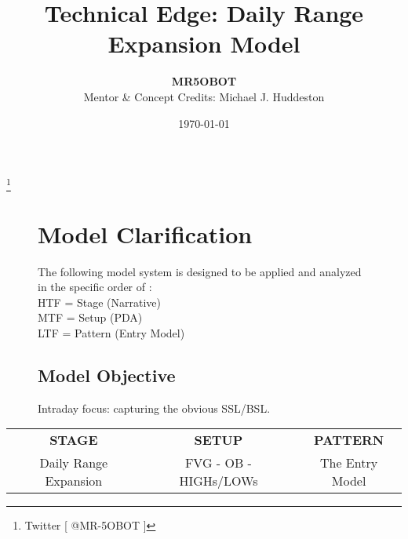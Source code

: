 \documentclass{article}
\title{Technical Edge: Daily Range Expansion Model}
\author{\textbf{MR5OBOT} \\ \small{Mentor \& Concept Credits: Michael J. Huddeston}}
\date{\today}
\renewcommand{\maketitle}{%
  \begin{center}
    \vspace*{\fill}
    {\huge\bfseries\thetitle\par}
    \vspace{1.5cm}
    {\Large\theauthor\par}
    \vspace{1cm}
    \vspace*{\fill}
  \end{center}
}
\begin{document}
\maketitle


\renewcommand{\thefootnote}{}
\footnote{Twitter [ @MR-5OBOT ]}
\vspace{0.8cm}

\begin{figure}[h]
  \begin{minipage}{.5\textwidth}
  \end{minipage}
  \begin{minipage}{.45\textwidth}
    \centering
    \section{Model Clarification}
    The following model system is designed to be applied and analyzed in the specific order of : \\
    \vspace{0.5cm}
    HTF = Stage (Narrative)\\
    \vspace{0.2cm}
    MTF = Setup (PDA) \\
    \vspace{0.2cm}
    LTF = Pattern (Entry Model)\\
    \vspace{0.2cm}
    \subsection{Model Objective}
    Intraday focus: capturing the obvious SSL/BSL.
  \end{minipage}
\end{figure}
\vspace{1.5cm}


\begin{table}[h!]
\centering
{}
\renewcommand{\arraystretch}{1}
\setlength{\tabcolsep}{25pt}
\begin{tabular}{|c|c|c|}
  \hline
  \multirow{2}{*}{\textbf{STAGE}} & \multirow{2}{*}{\textbf{SETUP}} & \multirow{2}{*}{\textbf{PATTERN}} \\
   & & \\
  \hline
  Daily Range Expansion & \rule{0pt}{60pt}FVG - OB - HIGHs/LOWs\rule[-60pt]{0pt}{0pt} & \-  The Entry Model  \- \\
  \hline
\end{tabular}
\end{table}
\newpage
\end{document}
